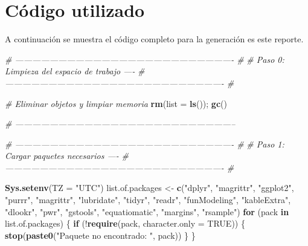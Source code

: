 \documentclass[
  12pt]{article}
\newenvironment{Shaded}{}{}
\newcommand{\CommentTok}[1]{\textcolor[rgb]{0.38,0.63,0.69}{\textit{#1}}}
\newcommand{\ControlFlowTok}[1]{\textcolor[rgb]{0.00,0.44,0.13}{\textbf{#1}}}
\newcommand{\DataTypeTok}[1]{\textcolor[rgb]{0.56,0.13,0.00}{#1}}
\newcommand{\KeywordTok}[1]{\textcolor[rgb]{0.00,0.44,0.13}{\textbf{#1}}}
\newcommand{\NormalTok}[1]{#1}
\newcommand{\OperatorTok}[1]{\textcolor[rgb]{0.40,0.40,0.40}{#1}}
\newcommand{\OtherTok}[1]{\textcolor[rgb]{0.00,0.44,0.13}{#1}}
\newcommand{\StringTok}[1]{\textcolor[rgb]{0.25,0.44,0.63}{#1}}
\begin{document}
\hypertarget{cuxf3digo-utilizado}{%
\section{Código utilizado}\label{cuxf3digo-utilizado}}

A continuación se muestra el código completo para la generación es este reporte.

\begin{Shaded}
\begin{Highlighting}[]
\CommentTok{# ---------------------------------------------------------------------------- #}
\CommentTok{# Paso 0: Limpieza del espacio de trabajo ----}
\CommentTok{# ---------------------------------------------------------------------------- #}

\CommentTok{# Eliminar objetos y limpiar memoria}
\KeywordTok{rm}\NormalTok{(}\DataTypeTok{list =} \KeywordTok{ls}\NormalTok{()); }\KeywordTok{gc}\NormalTok{()}

\CommentTok{# -----------------------------------------------------------------------------}

\CommentTok{# ---------------------------------------------------------------------------- #}
\CommentTok{# Paso 1: Cargar paquetes necesarios ----}
\CommentTok{# ---------------------------------------------------------------------------- #}

\KeywordTok{Sys.setenv}\NormalTok{(}\DataTypeTok{TZ =} \StringTok{"UTC"}\NormalTok{)}
\NormalTok{list.of.packages <-}\StringTok{ }\KeywordTok{c}\NormalTok{(}\StringTok{"dplyr"}\NormalTok{, }\StringTok{"magrittr"}\NormalTok{, }\StringTok{"ggplot2"}\NormalTok{, }\StringTok{"purrr"}\NormalTok{, }\StringTok{"magrittr"}\NormalTok{,}
                      \StringTok{"lubridate"}\NormalTok{, }\StringTok{"tidyr"}\NormalTok{, }\StringTok{"readr"}\NormalTok{, }\StringTok{"funModeling"}\NormalTok{, }\StringTok{"kableExtra"}\NormalTok{,}
                      \StringTok{"dlookr"}\NormalTok{, }\StringTok{"pwr"}\NormalTok{, }\StringTok{"gstools"}\NormalTok{, }\StringTok{"equatiomatic"}\NormalTok{, }\StringTok{"margins"}\NormalTok{,}
                      \StringTok{"rsample"}\NormalTok{)}
\ControlFlowTok{for}\NormalTok{ (pack }\ControlFlowTok{in}\NormalTok{ list.of.packages) \{}
  \ControlFlowTok{if}\NormalTok{ (}\OperatorTok{!}\KeywordTok{require}\NormalTok{(pack, }\DataTypeTok{character.only =} \OtherTok{TRUE}\NormalTok{)) \{}
    \KeywordTok{stop}\NormalTok{(}\KeywordTok{paste0}\NormalTok{(}\StringTok{"Paquete no encontrado: "}\NormalTok{, pack))}
\NormalTok{  \}}
\NormalTok{\}}


\end{Highlighting}
\end{Shaded}
\end{document}
